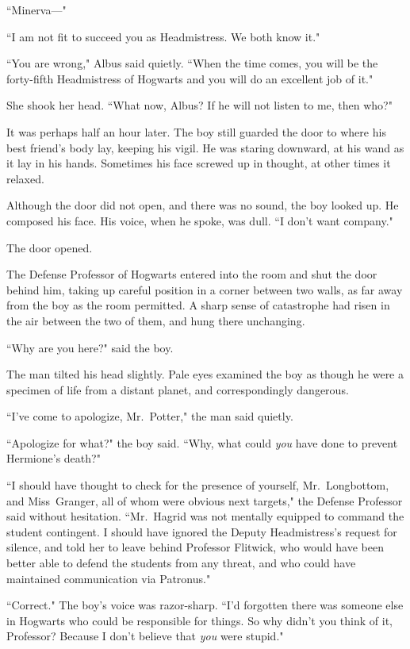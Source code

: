 ``Minerva---"

``I am not fit to succeed you as Headmistress. We both know it."

``You are wrong," Albus said quietly. ``When the time comes, you will be the forty-fifth Headmistress of Hogwarts and you will do an excellent job of it."

She shook her head. ``What now, Albus? If he will not listen to me, then who?"

\later

It was perhaps half an hour later. The boy still guarded the door to where his best friend's body lay, keeping his vigil. He was staring downward, at his wand as it lay in his hands. Sometimes his face screwed up in thought, at other times it relaxed.

Although the door did not open, and there was no sound, the boy looked up. He composed his face. His voice, when he spoke, was dull. ``I don't want company."

The door opened.

The Defense Professor of Hogwarts entered into the room and shut the door behind him, taking up careful position in a corner between two walls, as far away from the boy as the room permitted. A sharp sense of catastrophe had risen in the air between the two of them, and hung there unchanging.

``Why are you here?" said the boy.

The man tilted his head slightly. Pale eyes examined the boy as though he were a specimen of life from a distant planet, and correspondingly dangerous.

``I've come to apologize, Mr.~Potter," the man said quietly.

``Apologize for what?" the boy said. ``Why, what could \emph{you} have done to prevent Hermione's death?"

``I should have thought to check for the presence of yourself, Mr.~Longbottom, and Miss~Granger, all of whom were obvious next targets," the Defense Professor said without hesitation. ``Mr.~Hagrid was not mentally equipped to command the student contingent. I should have ignored the Deputy Headmistress's request for silence, and told her to leave behind Professor Flitwick, who would have been better able to defend the students from any threat, and who could have maintained communication via Patronus."

``Correct." The boy's voice was razor-sharp. ``I'd forgotten there was someone else in Hogwarts who could be responsible for things. So why didn't you think of it, Professor? Because I don't believe that \emph{you} were stupid."

